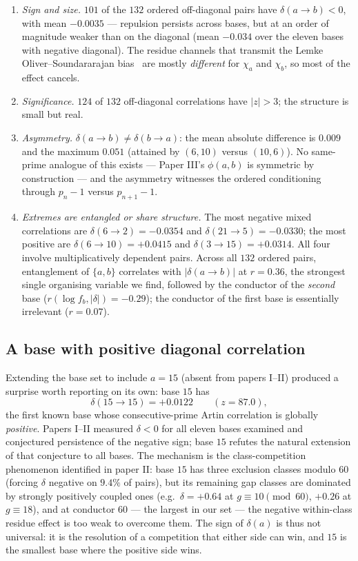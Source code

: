 \documentclass[11pt,reqno]{amsart}
\theoremstyle{plain}
\theoremstyle{definition}
\begin{document}
\begin{enumerate}
\item \emph{Sign and size.} $101$ of the $132$ ordered off-diagonal pairs
  have $\delta(a \to b) < 0$, with mean $-0.0035$ --- repulsion persists
  across bases, but at an order of magnitude weaker than on the diagonal
  (mean $-0.034$ over the eleven bases with negative diagonal). The residue channels that transmit the
  Lemke Oliver--Soundararajan bias~\cite{LOS2016} are mostly \emph{different}
  for $\chi_a$ and $\chi_b$, so most of the effect cancels.
\item \emph{Significance.} $124$ of $132$ off-diagonal correlations have
  $|z| > 3$; the structure is small but real.
\item \emph{Asymmetry.} $\delta(a \to b) \neq \delta(b \to a)$: the mean
  absolute difference is $0.009$ and the maximum $0.051$ (attained by
  $(6, 10)$ versus $(10, 6)$). No same-prime analogue of this exists ---
  Paper III's $\phi(a,b)$ is symmetric by construction --- and the asymmetry
  witnesses the ordered conditioning through $p_n - 1$ versus
  $p_{n+1} - 1$.
\item \emph{Extremes are entangled or share structure.} The most negative
  mixed correlations are $\delta(6 \to 2) = -0.0354$ and
  $\delta(21 \to 5) = -0.0330$; the most positive are
  $\delta(6 \to 10) = +0.0415$ and $\delta(3 \to 15) = +0.0314$. All four
  involve multiplicatively dependent pairs. Across all $132$ ordered pairs,
  entanglement of $\{a, b\}$ correlates with $|\delta(a \to b)|$ at
  $r = 0.36$, the strongest single organising variable we find, followed by
  the conductor of the \emph{second} base ($r(\log f_b, |\delta|) = -0.29$);
  the conductor of the first base is essentially irrelevant
  ($r = 0.07$).
\end{enumerate}

\subsection*{A base with positive diagonal correlation}
Extending the base set to include $a = 15$ (absent from papers I--II)
produced a surprise worth reporting on its own: base $15$ has
\[
  \delta(15 \to 15) = +0.0122 \qquad (z = 87.0),
\]
the first known base whose consecutive-prime Artin correlation is globally
\emph{positive}. Papers I--II measured $\delta < 0$ for all eleven bases
examined and conjectured persistence of the negative sign; base $15$ refutes
the natural extension of that conjecture to all bases. The mechanism is the
class-competition phenomenon identified in paper II: base $15$ has three
exclusion classes modulo $60$ (forcing $\delta$ negative on $9.4\%$ of
pairs), but its remaining gap classes are dominated by strongly positively
coupled ones (e.g.\ $\delta = +0.64$ at $g \equiv 10 \pmod{60}$, $+0.26$ at
$g \equiv 18$), and at conductor $60$ --- the largest in our set --- the
negative within-class residue effect is too weak to overcome them. The sign
of $\delta(a)$ is thus not universal: it is the resolution of a competition
that either side can win, and $15$ is the smallest base where the positive
side wins.
\end{document}
